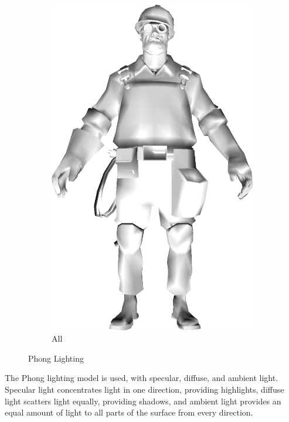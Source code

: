 \begin{figure}[h]
\begin{subfigure}[b]{0.18\textwidth}
        \includegraphics[width=\textwidth]{img/Lighting/combined.png}
        \caption{All}
        \label{fig:combined}
    \end{subfigure}
    \caption{Phong Lighting}
    \label{fig:Lighting}
\end{figure}

The Phong lighting model is used, with specular, diffuse, and ambient light. Specular light concentrates light in one direction, providing highlights, diffuse light scatters light equally, providing shadows, and ambient light provides an equal amount of light to all parts of the surface from every direction. 

